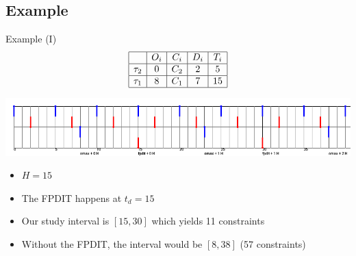 \documentclass{beamer}
\begin{document}
    \subsection{Example}

    \begin{frame}{Example (I)}
        \[
        \begin{array}{|r|c|c|c|c|}
         \hline
          & O_i & C_i & D_i & T_i \\
         \hline
         \tau_2 & 0 & C_2 & 2 & 5\\
         \hline
         \tau_1 & 8 & C_1 & 7 & 15\\
         \hline
        \end{array}
        \]

        \includegraphics[width=\textwidth]{figs/CspaceExampleArrDead.png}

        \begin{itemize}
            \item $H = 15$
            \item The FPDIT happens at $t_d = 15$
            \item Our study interval is $[15, 30]$ which yields 11 constraints
            \item Without the FPDIT, the interval would be $[8, 38]$ (57 constraints)
        \end{itemize}
    \end{frame}
\end{document}
